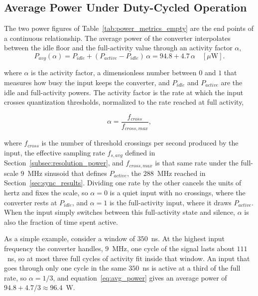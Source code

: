 \subsection{Average Power Under Duty-Cycled Operation}
\label{subsec:activity_power}

The two power figures of Table~\ref{tab:power_metrics_empty} are the end points of a continuous relationship. The average power of the converter interpolates between the idle floor and the full-activity value through an activity factor $\alpha$,
\begin{equation}
    P_{avg}(\alpha) = P_{idle} + (P_{active} - P_{idle})\,\alpha = 94.8 + 4.7\,\alpha \quad [\mu\mathrm{W}].
    \label{eq:avg_power}
\end{equation}

where $\alpha$ is the activity factor, a dimensionless number between $0$ and $1$ that measures how busy the input keeps the converter, and $P_{idle}$ and $P_{active}$ are the idle and full-activity powers. The activity factor is the rate at which the input crosses quantization thresholds, normalized to the rate reached at full activity,

\begin{equation}
    \alpha = \frac{f_{cross}}{f_{cross,max}},
    \label{eq:activity_factor}
\end{equation}

\noindent
where $f_{cross}$ is the number of threshold crossings per second produced by the input, the effective sampling rate $f_{s,avg}$ defined in Section~\ref{subsec:resolution_power}, and $f_{cross,max}$ is that same rate under the full-scale $9$~MHz sinusoid that defines $P_{active}$, the $288$~MHz reached in Section~\ref{sec:sync_results}. Dividing one rate by the other cancels the units of hertz and fixes the scale, so $\alpha = 0$ is a quiet input with no crossings, where the converter rests at $P_{idle}$, and $\alpha = 1$ is the full-activity input, where it draws $P_{active}$. When the input simply switches between this full-activity state and silence, $\alpha$ is also the fraction of time spent active.

As a simple example, consider a window of $350$~ns. At the highest input frequency the converter handles, $9$~MHz, one cycle of the signal lasts about $111$~ns, so at most three full cycles of activity fit inside that window. An input that goes through only one cycle in the same $350$~ns is active at a third of the full rate, so $\alpha = 1/3$, and equation~\eqref{eq:avg_power} gives an average power of $94.8 + 4.7/3 \approx 96.4$~\textmu W.

